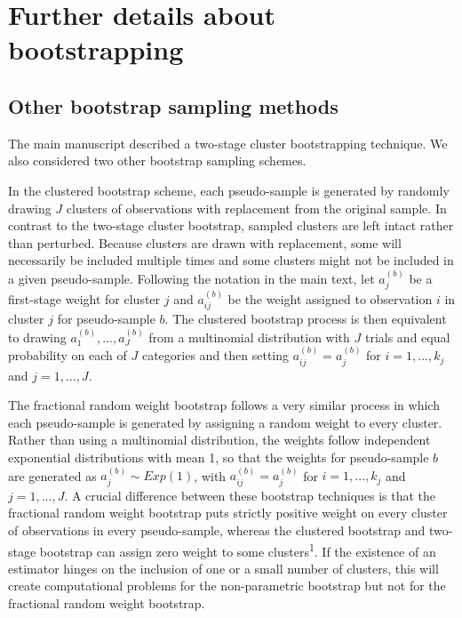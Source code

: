 \documentclass[
  american,
  man, donotrepeattitle,mask,floatsintext]{apa7}
\numberwithin{table}{section}
\numberwithin{equation}{section}
\numberwithin{figure}{section}
\begin{document}
\newpage

\section{Further details about bootstrapping}\label{bootstrap-details}

\subsection*{Other bootstrap sampling methods}\label{other-bootstrap-sampling-methods}

The main manuscript described a two-stage cluster bootstrapping technique. We also considered two other bootstrap sampling schemes.

In the clustered bootstrap scheme, each pseudo-sample is generated by randomly drawing \(J\) clusters of observations with replacement from the original sample.
In contrast to the two-stage cluster bootstrap, sampled clusters are left intact rather than perturbed.
Because clusters are drawn with replacement, some will necessarily be included multiple times and some clusters might not be included in a given pseudo-sample.
Following the notation in the main text, let \(a_j^{(b)}\) be a first-stage weight for cluster \(j\) and \(a_{ij}^{(b)}\) be the weight assigned to observation \(i\) in cluster \(j\) for pseudo-sample \(b\).
The clustered bootstrap process is then equivalent to drawing \(a_1^{(b)},...,a_J^{(b)}\) from a multinomial distribution with \(J\) trials and equal probability on each of \(J\) categories and then setting \(a_{ij}^{(b)} = a^{(b)}_j\) for \(i = 1,...,k_j\) and \(j = 1,...,J\).

The fractional random weight bootstrap follows a very similar process in which each pseudo-sample is generated by assigning a random weight to every cluster.
Rather than using a multinomial distribution, the weights follow independent exponential distributions with mean 1, so that the weights for pseudo-sample \(b\) are generated as \(a^{(b)}_j \sim Exp(1)\), with \(a_{ij}^{(b)} = a^{(b)}_j\) for \(i = 1,...,k_j\) and \(j = 1,...,J\).
A crucial difference between these bootstrap techniques is that the fractional random weight bootstrap puts strictly positive weight on every cluster of observations in every pseudo-sample, whereas the clustered bootstrap and two-stage bootstrap can assign zero weight to some clusters\textsuperscript{1}.
If the existence of an estimator hinges on the inclusion of one or a small number of clusters, this will create computational problems for the non-parametric bootstrap but not for the fractional random weight bootstrap.
\end{document}
